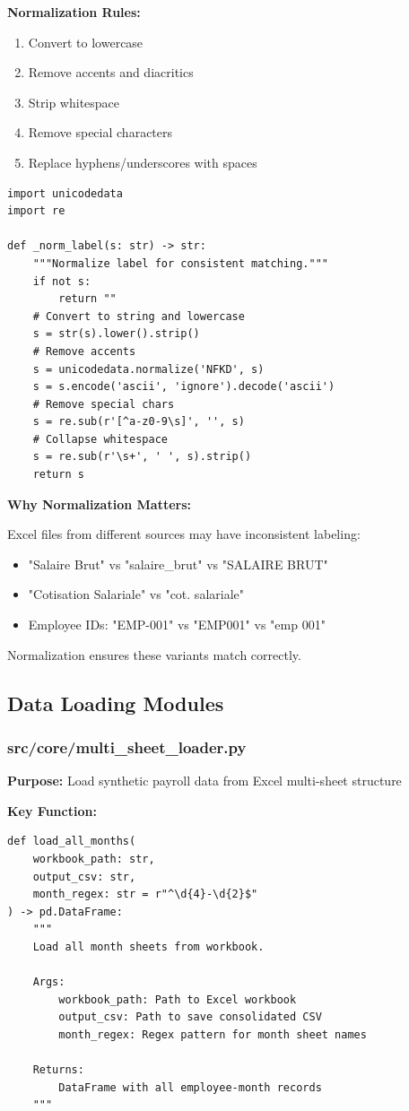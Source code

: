 \textbf{Normalization Rules:}
\begin{enumerate}
    \item Convert to lowercase
    \item Remove accents and diacritics
    \item Strip whitespace
    \item Remove special characters
    \item Replace hyphens/underscores with spaces
\end{enumerate}

\begin{lstlisting}[style=pythonstyle, caption=Normalization Function]
import unicodedata
import re

def _norm_label(s: str) -> str:
    """Normalize label for consistent matching."""
    if not s:
        return ""
    # Convert to string and lowercase
    s = str(s).lower().strip()
    # Remove accents
    s = unicodedata.normalize('NFKD', s)
    s = s.encode('ascii', 'ignore').decode('ascii')
    # Remove special chars
    s = re.sub(r'[^a-z0-9\s]', '', s)
    # Collapse whitespace
    s = re.sub(r'\s+', ' ', s).strip()
    return s
\end{lstlisting}

\textbf{Why Normalization Matters:}

Excel files from different sources may have inconsistent labeling:
\begin{itemize}
    \item "Salaire Brut" vs "salaire\_brut" vs "SALAIRE BRUT"
    \item "Cotisation Salariale" vs "cot. salariale"
    \item Employee IDs: "EMP-001" vs "EMP001" vs "emp 001"
\end{itemize}

Normalization ensures these variants match correctly.

\subsection{Data Loading Modules}

\subsubsection{src/core/multi\_sheet\_loader.py}

\textbf{Purpose:} Load synthetic payroll data from Excel multi-sheet structure

\textbf{Key Function:}
\begin{lstlisting}[style=pythonstyle]
def load_all_months(
    workbook_path: str,
    output_csv: str,
    month_regex: str = r"^\d{4}-\d{2}$"
) -> pd.DataFrame:
    """
    Load all month sheets from workbook.
    
    Args:
        workbook_path: Path to Excel workbook
        output_csv: Path to save consolidated CSV
        month_regex: Regex pattern for month sheet names
        
    Returns:
        DataFrame with all employee-month records
    """
\end{lstlisting}

